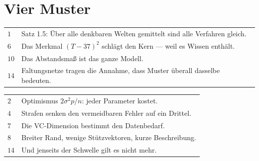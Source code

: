 \section{Vier Muster}

\begin{merksatz}
\begin{center}
{\small
\renewcommand{\arraystretch}{1.48}
\begin{tabular}{@{}P{1.4cm}P{7.0cm}@{}}
\toprule
$1$ & Satz 1.5: Über alle denkbaren Welten gemittelt sind alle Verfahren gleich.\\
$6$ & Das Merkmal $(T-37)^{2}$ schlägt den Kern --- weil es Wissen enthält.\\
$10$ & Das Abstandsmaß ist das ganze Modell.\\
$14$ & Faltungsnetze tragen die Annahme, dass Muster überall dasselbe bedeuten.\\
\bottomrule
\end{tabular}}
\end{center}

\begin{center}
\begin{minipage}{0.88\textwidth}
\end{minipage}
\end{center}
\end{merksatz}

\begin{merksatz}
\begin{center}
{\small
\renewcommand{\arraystretch}{1.48}
\begin{tabular}{@{}P{1.4cm}P{7.0cm}@{}}
\toprule
$2$ & Optimismus $2\sigma^{2}p/n$: jeder Parameter kostet.\\
$4$ & Strafen senken den vermeidbaren Fehler auf ein Drittel.\\
$7$ & Die VC-Dimension bestimmt den Datenbedarf.\\
$8$ & Breiter Rand, wenige Stützvektoren, kurze Beschreibung.\\
$14$ & \textcolor{akzent}{Und jenseits der Schwelle gilt es nicht mehr.}\\
\bottomrule
\end{tabular}}
\end{center}

\begin{center}
\begin{minipage}{0.88\textwidth}
\end{minipage}
\end{center}
\end{merksatz}

